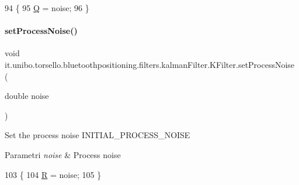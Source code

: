 \begin{DoxyCode}
94                                                   \{
95         \hyperlink{classit_1_1unibo_1_1torsello_1_1bluetoothpositioning_1_1filters_1_1kalmanFilter_1_1KFilter_a214fff6f5bc8eed06a7be5000d4ccfef_a214fff6f5bc8eed06a7be5000d4ccfef}{Q} = noise;
96     \}
\end{DoxyCode}
\hypertarget{classit_1_1unibo_1_1torsello_1_1bluetoothpositioning_1_1filters_1_1kalmanFilter_1_1KFilter_a6d9b8430448f2912c70d7e13c27fbed4_a6d9b8430448f2912c70d7e13c27fbed4}{}\label{classit_1_1unibo_1_1torsello_1_1bluetoothpositioning_1_1filters_1_1kalmanFilter_1_1KFilter_a6d9b8430448f2912c70d7e13c27fbed4_a6d9b8430448f2912c70d7e13c27fbed4} 
\paragraph{\texorpdfstring{set\+Process\+Noise()}{setProcessNoise()}}
{\footnotesize\ttfamily void it.\+unibo.\+torsello.\+bluetoothpositioning.\+filters.\+kalman\+Filter.\+K\+Filter.\+set\+Process\+Noise (\begin{DoxyParamCaption}\item[{double}]{noise }\end{DoxyParamCaption})}

Set the process noise I\+N\+I\+T\+I\+A\+L\+\_\+\+P\+R\+O\+C\+E\+S\+S\+\_\+\+N\+O\+I\+SE


\begin{DoxyParams}{Parametri}
{\em noise} & Process noise \\
\hline
\end{DoxyParams}

\begin{DoxyCode}
103                                               \{
104         \hyperlink{classit_1_1unibo_1_1torsello_1_1bluetoothpositioning_1_1filters_1_1kalmanFilter_1_1KFilter_ac5b2a95b9934717adadb214003d7e7bc_ac5b2a95b9934717adadb214003d7e7bc}{R} = noise;
105     \}
\end{DoxyCode}


